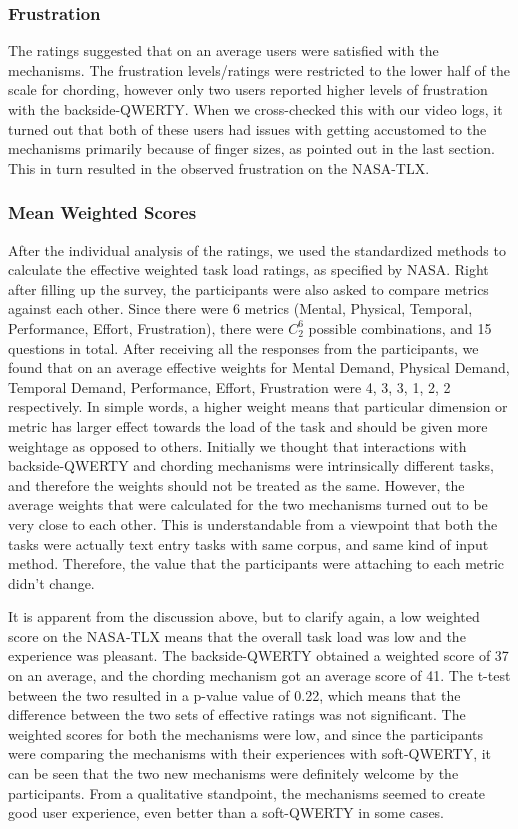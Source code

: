 \subsubsection{Frustration}

The ratings suggested that on an average users were satisfied with the
mechanisms. The frustration levels/ratings were restricted to the
lower half of the scale for chording, however only two users reported
higher levels of frustration with the backside-QWERTY. When we
cross-checked this with our video logs, it turned out that both of
these users had issues with getting accustomed to the mechanisms
primarily because of finger sizes, as pointed out in the last
section. This in turn resulted in the observed frustration on the
NASA-TLX.

\subsubsection{Mean Weighted Scores}
After the individual analysis of the ratings, we used the standardized
methods to calculate the effective weighted task load ratings, as
specified by NASA. Right after filling up the survey, the participants
were also asked to compare metrics against each other. Since there
were 6 metrics (Mental, Physical, Temporal, Performance, Effort,
Frustration), there were $C_{2}^{6}$ possible combinations, and 15
questions in total. After receiving all the responses from the
participants, we found that on an average effective weights for Mental
Demand, Physical Demand, Temporal Demand, Performance, Effort,
Frustration were 4, 3, 3, 1, 2, 2 respectively. In simple words, a
higher weight means that particular dimension or metric has larger
effect towards the load of the task and should be given more weightage
as opposed to others. Initially we thought that interactions with
backside-QWERTY and chording mechanisms were intrinsically different
tasks, and therefore the weights should not be treated as the
same. However, the average weights that were calculated for the two
mechanisms turned out to be very close to each other. This is
understandable from a viewpoint that both the tasks were actually text
entry tasks with same corpus, and same kind of input
method. Therefore, the value that the participants were attaching to
each metric didn't change.

It is apparent from the discussion above, but to clarify again, a low
weighted score on the NASA-TLX means that the overall task load was
low and the experience was pleasant. The backside-QWERTY obtained a
weighted score of 37 on an average, and the chording mechanism got an
average score of 41. The t-test between the two resulted in a p-value
value of 0.22, which means that the difference between the two sets of
effective ratings was not significant. The weighted scores for both
the mechanisms were low, and since the participants were comparing the
mechanisms with their experiences with soft-QWERTY, it can be seen
that the two new mechanisms were definitely welcome by the
participants. From a qualitative standpoint, the mechanisms seemed to
create good user experience, even better than a soft-QWERTY in some
cases.

